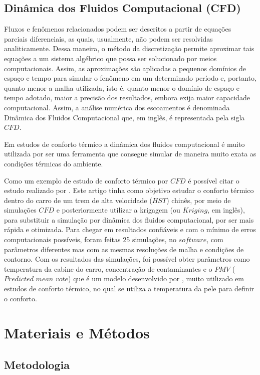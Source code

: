 \documentclass[acronym,symbols]{fei}
\begin{document}
\section{Dinâmica dos Fluidos Computacional (CFD)}

Fluxos e fenômenos relacionados podem ser descritos a partir de equações parciais diferenciais, as quais, usualmente, não podem ser resolvidas analiticamente. Dessa maneira, o método da discretização permite aproximar tais equações a um sistema algébrico que possa ser solucionado por meios computacionais. Assim, as aproximações são aplicadas a pequenos domínios de espaço e tempo \cite{peric2002computational} para simular o fenômeno em um determinado período e, portanto, quanto menor a malha utilizada, isto é, quanto menor o domínio de espaço e tempo adotado, maior a precisão dos resultados, embora exija maior capacidade computacional. Assim, a análise numérica dos escoamentos é denominada Dinâmica dos Fluidos Computacional que, em inglês, é representada pela sigla $CFD$. 

Em estudos de conforto térmico a dinâmica dos fluidos computacional é muito utilizada por ser uma ferramenta que consegue simular de maneira muito exata as condições térmicas do ambiente.   

Como um exemplo de estudo de conforto térmico por $CFD$ é possível citar o estudo realizado por \textcite{li2019multi}. Este artigo tinha como objetivo estudar o conforto térmico dentro do carro de um trem de alta velocidade ($HST$) chinês, por meio de simulações $CFD$ e posteriormente utilizar a krigagem (ou $Kriging$, em inglês), para substituir a simulação por dinâmica dos fluidos computacional, por ser mais rápida e otimizada. 
Para chegar em resultados confiáveis e com o mínimo de erros computacionais possíveis, foram feitas 25 simulações, no $software$, com parâmetros diferentes mas com as mesmas resoluções de malha e condições de contorno. Com os resultados das simulações, foi possível obter parâmetros como temperatura da cabine do carro, concentração de contaminantes e o $PMV$ ($Predicted$ $mean$ $vote$) que é um modelo desenvolvido por \textcite{fanger1970thermal}, muito utilizado em estudos de conforto térmico, no qual se utiliza a temperatura da pele para definir o conforto.


\chapter{Materiais e Métodos}

\section{Metodologia}
\end{document}
